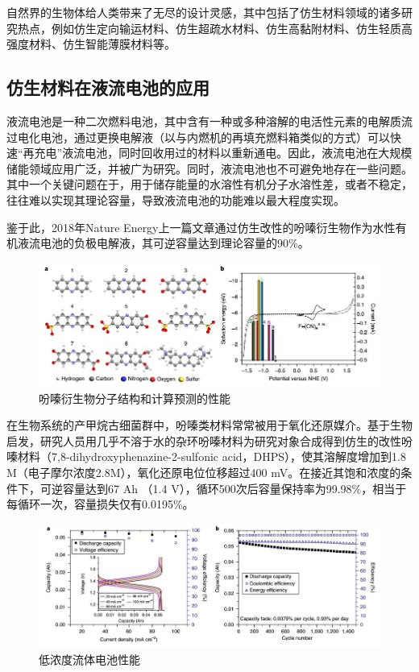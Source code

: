 \documentclass[UTF8,9pt]{ctexart}
\newcommand\sub{\subsection}                                           %
\begin{document}
自然界的生物体给人类带来了无尽的设计灵感，其中包括了仿生材料领域的诸多研究热点，例如仿生定向输运材料、仿生超疏水材料、仿生高黏附材料、仿生轻质高强度材料、仿生智能薄膜材料等。
\sub{仿生材料在液流电池的应用}
液流电池是一种二次燃料电池，其中含有一种或多种溶解的电活性元素的电解质流过电化电池，通过更换电解液（以与内燃机的再填充燃料箱类似的方式）可以快速“再充电”液流电池，同时回收用过的材料以重新通电。因此，液流电池在大规模储能领域应用广泛，并被广为研究。同时，液流电池也不可避免地存在一些问题。其中一个关键问题在于，用于储存能量的水溶性有机分子水溶性差，或者不稳定，往往难以实现其理论容量，导致液流电池的功能难以最大程度实现。

鉴于此，2018年Nature Energy上一篇文章通过仿生改性的吩嗪衍生物作为水性有机液流电池的负极电解液，其可逆容量达到理论容量的90\%。

\begin{figure}[htbp]
    \centering
    \includegraphics[scale=0.4]{3.jpg}
    \caption{吩嗪衍生物分子结构和计算预测的性能}
\end{figure}

在生物系统的产甲烷古细菌群中，吩嗪类材料常常被用于氧化还原媒介。基于生物启发，研究人员用几乎不溶于水的杂环吩嗪材料为研究对象合成得到仿生的改性吩嗪材料（7,8-dihydroxyphenazine-2-sulfonic acid，DHPS），使其溶解度增加到1.8 M（电子摩尔浓度2.8M），氧化还原电位位移超过400 mV。在接近其饱和浓度的条件下，可逆容量达到67 Ah （1.4 V），循环500次后容量保持率为99.98\%，相当于每循环一次，容量损失仅有0.0195\%。

\begin{figure}[htbp]
    \centering
    \includegraphics[scale=0.4]{4.jpg}
    \caption{低浓度流体电池性能}
\end{figure}
\end{document}
